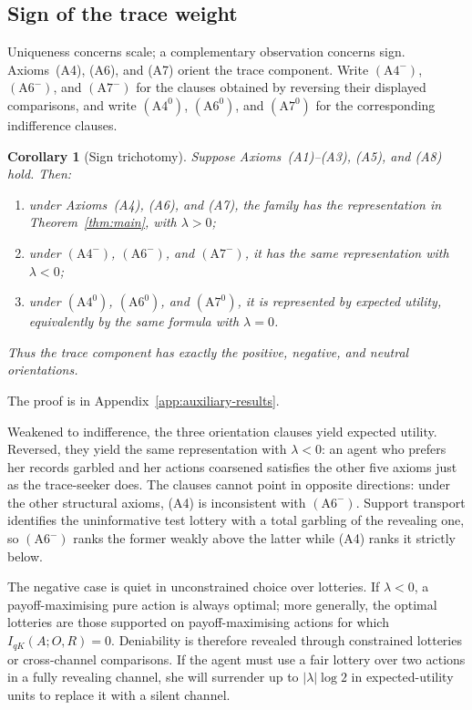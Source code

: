 \documentclass[11pt,a4paper]{article}
\newtheorem{corollary}[theorem]{Corollary}
\theoremstyle{definition}
\newcommand{\I}{I}
\newcommand{\1}{\mathbf 1}
\begin{document}
\subsection{Sign of the trace weight}

Uniqueness concerns scale; a complementary observation concerns sign.  Axioms~\textup{(A4)},
\textup{(A6)}, and \textup{(A7)} orient the trace component.  Write $(\mathrm{A}4^-)$,
$(\mathrm{A}6^-)$, and $(\mathrm{A}7^-)$ for the clauses obtained by reversing their displayed comparisons,
and write $(\mathrm{A}4^0)$, $(\mathrm{A}6^0)$, and $(\mathrm{A}7^0)$ for the corresponding indifference clauses.

\begin{corollary}[Sign trichotomy]\label{cor:signduality}
Suppose Axioms~\textup{(A1)--(A3)}, \textup{(A5)}, and
\textup{(A8)} hold.  Then:
\begin{enumerate}[label=\textup{(\roman*)},leftmargin=*]
\item under Axioms~\textup{(A4)}, \textup{(A6)}, and \textup{(A7)}, the family has the representation in
Theorem~\ref{thm:main}, with $\lambda>0$;
\item under $(\mathrm{A}4^-)$, $(\mathrm{A}6^-)$, and $(\mathrm{A}7^-)$, it has the same representation with
$\lambda<0$;
\item under $(\mathrm{A}4^0)$, $(\mathrm{A}6^0)$, and $(\mathrm{A}7^0)$, it is represented by expected utility,
equivalently by the same formula with $\lambda=0$.
\end{enumerate}
Thus the trace component has exactly the positive, negative, and neutral orientations.
\end{corollary}

The proof is in Appendix~\ref{app:auxiliary-results}.

Weakened to indifference, the three orientation clauses yield expected utility.  Reversed, they yield the same
representation with $\lambda<0$: an agent who prefers her records garbled and her actions coarsened satisfies
the other five axioms just as the trace-seeker does.  The clauses cannot point in opposite directions:
under the other structural axioms, \textup{(A4)} is inconsistent with $(\mathrm{A}6^-)$.  Support transport
identifies the uninformative test lottery with a total garbling of the revealing one, so $(\mathrm{A}6^-)$ ranks
the former weakly above the latter while \textup{(A4)} ranks it strictly below.

The negative case is quiet in unconstrained choice over lotteries.  If $\lambda<0$, a payoff-maximising pure
action is always optimal; more generally, the optimal lotteries are those supported on payoff-maximising
actions for which $\I_{qK}(A;O,R)=0$.  Deniability is therefore revealed through constrained lotteries or
cross-channel comparisons.  If the agent must use a fair lottery over two actions in a fully revealing channel,
she will surrender up to $|\lambda|\log2$ in expected-utility units to replace it with a silent channel.
\end{document}
